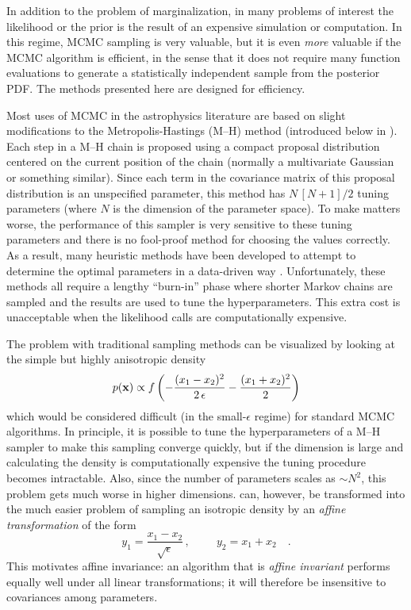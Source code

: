In addition to the problem of marginalization, in many problems of
interest the likelihood or the prior is the result of an expensive
simulation or computation. In this regime, MCMC sampling is very
valuable, but it is even \emph{more} valuable if the MCMC algorithm is
efficient, in the sense that it does not require many function
evaluations to generate a statistically independent sample from the
posterior PDF.  The methods presented here are designed for efficiency.

Most uses of MCMC in the astrophysics literature are based on slight
modifications to the Metropolis-Hastings (M--H) method (introduced
below in ).  Each step in a M--H chain is proposed using a
compact proposal distribution centered on the current position of the
chain (normally a multivariate Gaussian or something similar). Since
each term in the covariance matrix of this proposal distribution is an
unspecified parameter, this method has $N\,[N+1]/2$ tuning parameters
(where $N$ is the dimension of the parameter space).  To make matters
worse, the performance of this sampler is very sensitive to these
tuning parameters and there is no fool-proof method for choosing the
values correctly. As a result, many heuristic methods have been
developed to attempt to determine the optimal parameters in a
data-driven way \citep[for
  example,][]{Gregory:2005,Dunkley:2005,Widrow:2008}. Unfortunately,
these methods all require a lengthy ``burn-in'' phase where shorter
Markov chains are sampled and the results are used to tune the
hyperparameters. This extra cost is unacceptable when the likelihood
calls are computationally expensive.

The problem with traditional sampling methods can be visualized by looking
at the simple but highly anisotropic density
\begin{equation}
    \eqlabel{anisotropic}
    p(\mathbf{x}) \propto f \left (-\frac{(x_1-x_2)^2}{2\,\epsilon}
                                        - \frac{(x_1+x_2)^2}{2} \right )
\end{equation}
which would be considered difficult (in the small-$\epsilon$ regime) for
standard MCMC algorithms. In principle, it is possible to tune the
hyperparameters of a M--H sampler to make this sampling converge quickly,
but if the dimension is large and calculating the density
is computationally expensive the tuning procedure becomes intractable.
Also, since the number of parameters scales as $\sim N^2$, this problem gets
much worse in higher dimensions.
 can, however, be transformed into the much easier problem of
sampling an isotropic density by an \emph{affine transformation} of the form
\begin{equation}
    y_1 = \frac{x_1-x_2}{\sqrt{\epsilon}} \, ,
        \hspace{1cm} y_2 = x_1 + x_2 \quad .
\end{equation}
This motivates affine invariance: an algorithm that is \emph{affine invariant}
performs equally well under all linear transformations; it will therefore be
insensitive to
covariances among parameters.

